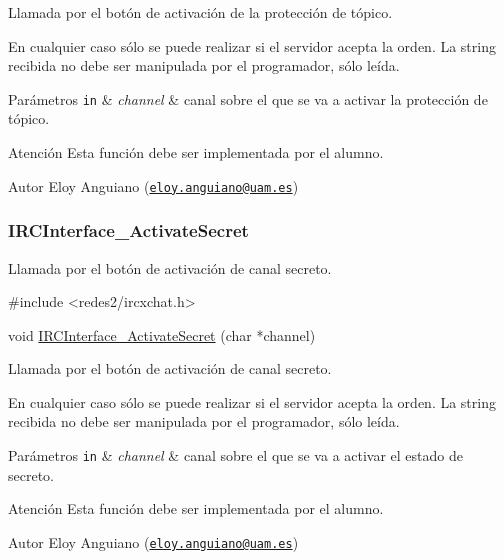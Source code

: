 Llamada por el botón de activación de la protección de tópico.

En cualquier caso sólo se puede realizar si el servidor acepta la orden. La string recibida no debe ser manipulada por el programador, sólo leída.


\begin{DoxyParams}[1]{Parámetros}
\mbox{\tt in}  & {\em channel} & canal sobre el que se va a activar la protección de tópico.\\
\hline
\end{DoxyParams}
\begin{DoxyWarning}{Atención}
Esta función debe ser implementada por el alumno.
\end{DoxyWarning}
\begin{DoxyAuthor}{Autor}
Eloy Anguiano (\href{mailto:eloy.anguiano@uam.es}{\tt eloy.\+anguiano@uam.\+es})
\end{DoxyAuthor}


 \hypertarget{IRCInterface_ActivateSecret}{}\subsubsection{I\+R\+C\+Interface\+\_\+\+Activate\+Secret}\label{IRCInterface_ActivateSecret}
Llamada por el botón de activación de canal secreto.


\begin{DoxyCode}
\textcolor{preprocessor}{#include <redes2/ircxchat.h>}

\textcolor{keywordtype}{void} \hyperlink{G-2313-06-P2__client_8c_aa9e9155115b834d85a4d10cb27f99093}{IRCInterface\_ActivateSecret} (\textcolor{keywordtype}{char} *channel)
\end{DoxyCode}


Llamada por el botón de activación de canal secreto.

En cualquier caso sólo se puede realizar si el servidor acepta la orden. La string recibida no debe ser manipulada por el programador, sólo leída.


\begin{DoxyParams}[1]{Parámetros}
\mbox{\tt in}  & {\em channel} & canal sobre el que se va a activar el estado de secreto.\\
\hline
\end{DoxyParams}
\begin{DoxyWarning}{Atención}
Esta función debe ser implementada por el alumno.
\end{DoxyWarning}
\begin{DoxyAuthor}{Autor}
Eloy Anguiano (\href{mailto:eloy.anguiano@uam.es}{\tt eloy.\+anguiano@uam.\+es})
\end{DoxyAuthor}


